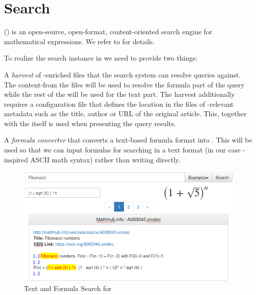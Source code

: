 \section{Search} \label{sec:Search}

{\mws} (\mwss) \cite{KohPro:man13} is an open-source, open-format, content-oriented search
engine for mathematical expressions. We refer to \cite{KohPro:man13} for details.

To realize the search instance in \mwss we need to provide two things:
\begin{compactenum}
 \item A \emph{harvest} of \mathml-enriched \html files that the search system can resolve queries against.
 The content-\mathml from the files will be used to resolve the formula part of the query while the rest of the \html
will be used for the text part. The harvest additionally requires a configuration file
that defines the location in the \html files of \mwss-relevant metadata such as the title, author or URL of the
original
article. This, together with the \html itself is used when presenting the query results.
 \item A \emph{formula converter} that converts a text-based formula format into \mathml. This will be used so that
 we can input formulas for searching in a text format (in our case \oeis-inspired ASCII math syntax) rather than
 writing
 \mathml directly.
\end{compactenum}

\begin{figure}
\centering
 \includegraphics[width=15cm]{search.png}
 \caption{Text and Formula Search for \oeis}\label{fig:search}
\end{figure}

